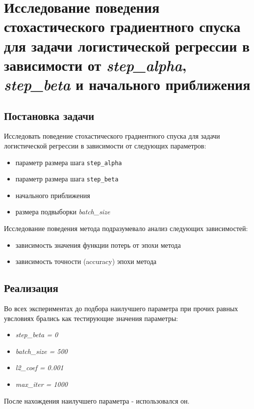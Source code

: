 \documentclass[14pt]{extarticle}
\begin{document}
\section{Исследование поведения стохастического градиентного спуска для задачи логистической регрессии в зависимости от \textit{step\_alpha}, \textit{step\_beta} и начального приближения} \label{sec:section6}

\subsection{Постановка задачи}

Исследовать поведение стохастического градиентного спуска для задачи логистической регрессии в зависимости от следующих параметров:
\begin{itemize}
    \item параметр размера шага \texttt{step\_alpha}
    \item параметр размера шага \texttt{step\_beta}
    \item начального приближения
    \item размера подвыборки \textit{batch\_size}
\end{itemize}

Исследование поведения метода подразумевало анализ следующих зависимостей:
\begin{itemize}
    \item зависимость значения функции потерь от эпохи метода
    \item зависимость точности (accuracy) эпохи метода
\end{itemize}

\subsection{Реализация}

Во всех экспериментах до подбора наилучшего параметра при прочих равных увсловиях брались как тестирующие значения параметры:
\begin{itemize}
    \item \textit{step\_beta = 0}
    \item \textit{batch\_size = 500}
    \item \textit{l2\_coef = 0.001}
    \item \textit{max\_iter = 1000}
\end{itemize}

После нахождения наилучшего параметра - использовался он.
\end{document}

